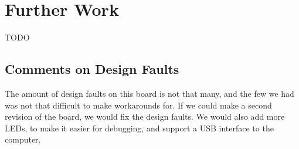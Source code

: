 \section{Further Work}

TODO

\subsection{Comments on Design Faults}
The amount of design faults on this board is not that many, and the few we had was not that difficult to make workarounds for.
If we could make a second revision of the board, we would fix the design faults.
We would also add more LEDs, to make it easier for debugging, and support a USB interface to the computer.

